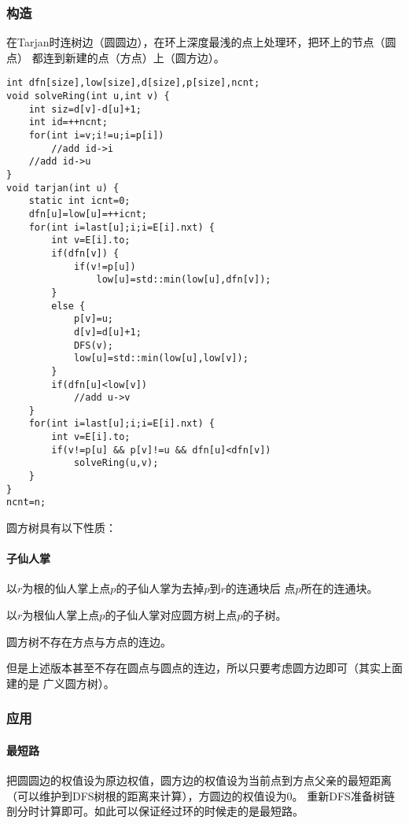 \subsubsection{构造}
在Tarjan时连树边（圆圆边），在环上深度最浅的点上处理环，把环上的节点（圆点）
都连到新建的点（方点）上（圆方边）。

\begin{lstlisting}
int dfn[size],low[size],d[size],p[size],ncnt;
void solveRing(int u,int v) {
    int siz=d[v]-d[u]+1;
    int id=++ncnt;
    for(int i=v;i!=u;i=p[i])
        //add id->i
    //add id->u
}
void tarjan(int u) {
    static int icnt=0;
    dfn[u]=low[u]=++icnt;
    for(int i=last[u];i;i=E[i].nxt) {
        int v=E[i].to;
        if(dfn[v]) {
            if(v!=p[u])
                low[u]=std::min(low[u],dfn[v]);
        }
        else {
            p[v]=u;
            d[v]=d[u]+1;
            DFS(v);
            low[u]=std::min(low[u],low[v]);
        }
        if(dfn[u]<low[v])
            //add u->v
    }
    for(int i=last[u];i;i=E[i].nxt) {
        int v=E[i].to;
        if(v!=p[u] && p[v]!=u && dfn[u]<dfn[v])
            solveRing(u,v);
    }
}
ncnt=n;
\end{lstlisting}

圆方树具有以下性质：
\paragraph{子仙人掌} 以$r$为根的仙人掌上点$p$的子仙人掌为去掉$p$到$r$的连通块后
点$p$所在的连通块。
\begin{property}
    以$r$为根仙人掌上点$p$的子仙人掌对应圆方树上点$p$的子树。
\end{property}
\begin{property}
    圆方树不存在方点与方点的连边。
\end{property}
但是上述版本甚至不存在圆点与圆点的连边，所以只要考虑圆方边即可（其实上面建的是
广义圆方树）。
\subsubsection{应用}
\paragraph{最短路}
把圆圆边的权值设为原边权值，圆方边的权值设为当前点到方点父亲的最短距离
（可以维护到DFS树根的距离来计算），方圆边的权值设为0。
重新DFS准备树链剖分时计算即可。如此可以保证经过环的时候走的是最短路。

